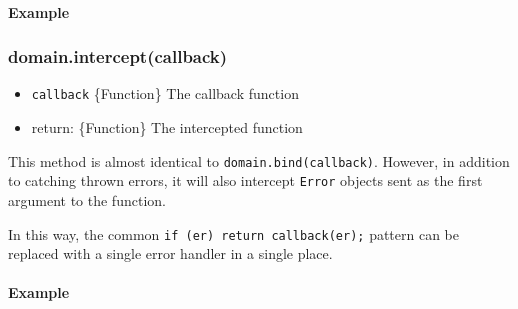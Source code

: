 \paragraph{Example}

\begin{Shaded}
\begin{Highlighting}[]
 \NormalTok{();}

 
  \NormalTok{, }\NormalTok{(}
     
  \NormalTok{\}));}
\NormalTok{\}}

\NormalTok{(}\NormalTok{, }
\NormalTok{\});}
\end{Highlighting}
\end{Shaded}

\subsubsection{domain.intercept(callback)}

\begin{itemize}
\item
  \texttt{callback} \{Function\} The callback function
\item
  return: \{Function\} The intercepted function
\end{itemize}

This method is almost identical to \texttt{domain.bind(callback)}.
However, in addition to catching thrown errors, it will also intercept
\texttt{Error} objects sent as the first argument to the function.

In this way, the common \texttt{if (er) return callback(er);} pattern
can be replaced with a single error handler in a single place.

\paragraph{Example}

